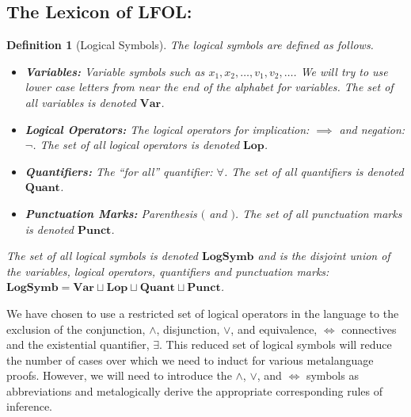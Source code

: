 \documentclass[12pt]{article}
\theoremstyle{break}
\newtheorem{definition}{Definition}[section]
\theoremstyle{break}
\theoremstyle{break}
\theoremstyle{break}
\theoremstyle{break}
\newtheorem{informal definition}[definition]{Informal Definition}
\newcommand{\qq}[1]{``#1''}
\begin{document}
\subsection{The Lexicon of LFOL:}

\begin{definition}[Logical Symbols]
The logical symbols are defined as follows.
\begin{itemize}
\item{\textbf{Variables:} Variable symbols such as $x_1, x_2, \ldots, v_1, v_2, \ldots$. We will try to use lower case letters from near the end of the alphabet for variables. The set of all variables is denoted $\textbf{Var}$.}
\item{\textbf{Logical Operators:} The logical operators for implication: $\implies$ and negation: $\lnot$. The set of all logical operators is denoted $\textbf{Lop}$.}
\item{\textbf{Quantifiers:} The \qq{for all} quantifier: $\forall$. The set of all quantifiers is denoted $\textbf{Quant}$.}
\item{\textbf{Punctuation Marks:} Parenthesis $($ and $)$. The set of all punctuation marks is denoted $\textbf{Punct}$.}
\end{itemize}

The set of all logical symbols is denoted $\textbf{LogSymb}$ and is the disjoint union of the variables, logical operators, quantifiers and punctuation marks: $\textbf{LogSymb} = \textbf{Var} \sqcup \textbf{Lop} \sqcup \textbf{Quant} \sqcup \textbf{Punct}$.
\end{definition}

We have chosen to use a restricted set of logical operators in the language to the exclusion of the conjunction, $\land$, disjunction, $\lor$, and equivalence, $\iff$ connectives and the existential quantifier, $\exists$.
This reduced set of logical symbols will reduce the number of cases over which we need to induct for various metalanguage proofs.
However, we will need to introduce the $\land$, $\lor$, and $\iff$ symbols as abbreviations and metalogically derive the appropriate corresponding rules of inference.
\end{document}
